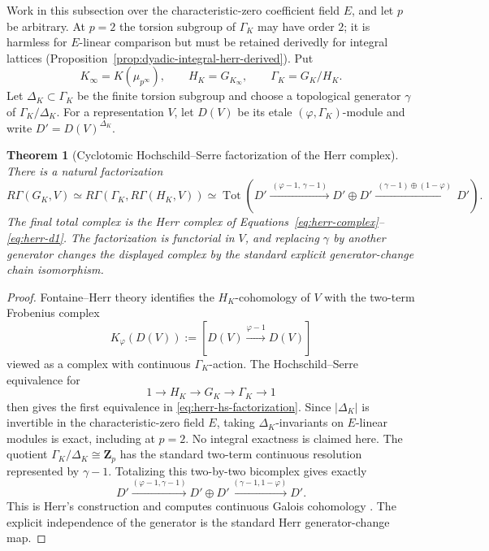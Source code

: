 \documentclass[11pt]{article}
\newtheorem{theorem}{Theorem}[section]
\theoremstyle{definition}
\newcommand{\Tot}{\operatorname{Tot}}
\begin{document}
Work in this subsection over the characteristic-zero coefficient field $E$, and let $p$ be arbitrary.  At $p=2$ the torsion subgroup of $\Gamma_K$ may have order $2$; it is harmless for $E$-linear comparison but must be retained derivedly for integral lattices (Proposition~\ref{prop:dyadic-integral-herr-derived}).  Put
\[
 K_\infty=K(\mu_{p^\infty}),
 \qquad
 H_K=G_{K_\infty},
 \qquad
 \Gamma_K=G_K/H_K.
\]
Let $\Delta_K\subset\Gamma_K$ be the finite torsion subgroup and choose a topological generator $\gamma$ of $\Gamma_K/\Delta_K$.  For a representation $V$, let $D(V)$ be its etale $(\varphi,\Gamma_K)$-module and write $D'=D(V)^{\Delta_K}$.

\begin{theorem}[Cyclotomic Hochschild--Serre factorization of the Herr complex]\label{thm:herr-hochschild-serre}
There is a natural factorization
\begin{equation}\label{eq:herr-hs-factorization}
 R\Gamma(G_K,V)
 \simeq
 R\Gamma\!\left(
 \Gamma_K,
 R\Gamma(H_K,V)
 \right)
 \simeq
 \Tot\!\left(
 D'
 \xrightarrow{\ (\varphi-1,\,\gamma-1)\ }
 D'\oplus D'
 \xrightarrow{\ (\gamma-1)\oplus(1-\varphi)\ }
 D'
 \right).
\end{equation}
The final total complex is the Herr complex of Equations~\eqref{eq:herr-complex}--\eqref{eq:herr-d1}.  The factorization is functorial in $V$, and replacing $\gamma$ by another generator changes the displayed complex by the standard explicit generator-change chain isomorphism.
\end{theorem}

\begin{proof}
Fontaine--Herr theory identifies the $H_K$-cohomology of $V$ with the two-term Frobenius complex
\[
 K_\varphi(D(V))
 :=
 [D(V)\xrightarrow{\varphi-1}D(V)]
\]
viewed as a complex with continuous $\Gamma_K$-action.  The Hochschild--Serre equivalence for
\[
1\longrightarrow H_K\longrightarrow G_K\longrightarrow\Gamma_K\longrightarrow1
\]
then gives the first equivalence in \eqref{eq:herr-hs-factorization}.  Since $|\Delta_K|$ is invertible in the characteristic-zero field $E$, taking $\Delta_K$-invariants on $E$-linear modules is exact, including at $p=2$.  No integral exactness is claimed here.  The quotient $\Gamma_K/\Delta_K\cong\mathbf Z_p$ has the standard two-term continuous resolution represented by $\gamma-1$.  Totalizing this two-by-two bicomplex gives exactly
\[
D'\xrightarrow{(\varphi-1,\gamma-1)}D'\oplus D'
\xrightarrow{(\gamma-1,1-\varphi)}D'.
\]
This is Herr's construction and computes continuous Galois cohomology \cite{HerrSurvey,LiuCohomology,KPXFamilies}.  The explicit independence of the generator is the standard Herr generator-change map.
\end{proof}
\end{document}
